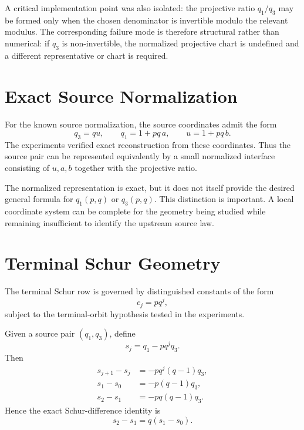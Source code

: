 \documentclass[11pt]{article}
\begin{document}
A critical implementation point was also isolated: the projective ratio $q_1/q_3$ may be formed only when the chosen denominator is invertible modulo the relevant modulus. The corresponding failure mode is therefore structural rather than numerical: if $q_3$ is non-invertible, the normalized projective chart is undefined and a different representative or chart is required.

\section{Exact Source Normalization}

For the known source normalization, the source coordinates admit the form
\begin{equation}
    q_3 = q u,
    \qquad
    q_1 = 1+pq\,a,
    \qquad
    u=1+pq\,b.
\end{equation}
The experiments verified exact reconstruction from these coordinates. Thus the source pair can be represented equivalently by a small normalized interface consisting of $u,a,b$ together with the projective ratio.

The normalized representation is exact, but it does not itself provide the desired general formula for $q_1(p,q)$ or $q_3(p,q)$. This distinction is important. A local coordinate system can be complete for the geometry being studied while remaining insufficient to identify the upstream source law.

\section{Terminal Schur Geometry}

The terminal Schur row is governed by distinguished constants of the form
\begin{equation}
    c_j = p q^j,
\end{equation}
subject to the terminal-orbit hypothesis tested in the experiments.

Given a source pair $(q_1,q_3)$, define
\begin{equation}
    s_j = q_1 - p q^j q_3.
\end{equation}
Then
\begin{align}
    s_{j+1}-s_j
      &= -p q^j(q-1)q_3,\\
    s_1-s_0
      &= -p(q-1)q_3,\\
    s_2-s_1
      &= -pq(q-1)q_3.
\end{align}
Hence the exact Schur-difference identity is
\begin{equation}
    s_2-s_1 = q(s_1-s_0).
\end{equation}
\end{document}
